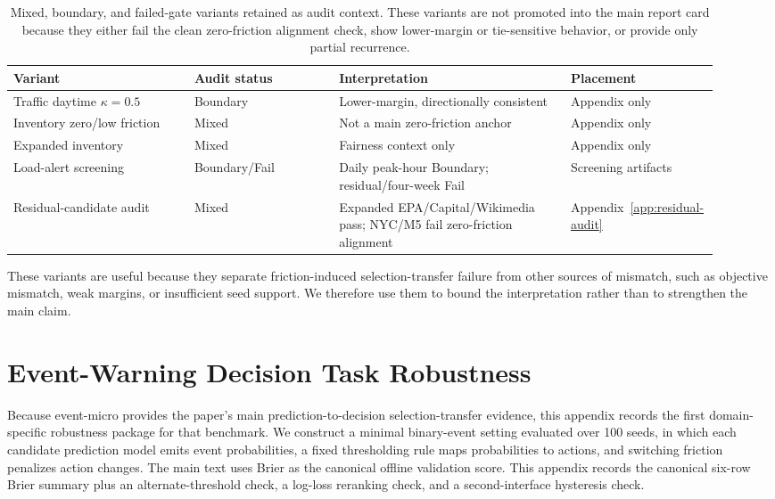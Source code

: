 \documentclass{article}
\begin{document}
\begin{table}[!htbp]
\centering
\begin{minipage}{\appnarrowtablewidth}
\centering
\scriptsize
\setlength{\tabcolsep}{3pt}
\renewcommand{\arraystretch}{0.98}
\begin{tabular}{p{0.25\linewidth}p{0.20\linewidth}p{0.32\linewidth}p{0.15\linewidth}}
\toprule
Variant & Audit status & Interpretation & Placement \\
\midrule
Traffic daytime $\kappa=0.5$ & Boundary & Lower-margin, directionally consistent & Appendix only \\
Inventory zero/low friction & Mixed & Not a main zero-friction anchor & Appendix only \\
Expanded inventory & Mixed & Fairness context only & Appendix only \\
Load-alert screening & Boundary/Fail & Daily peak-hour Boundary; residual/four-week Fail & Screening artifacts \\
Residual-candidate audit & Mixed & Expanded EPA/Capital/Wikimedia pass; NYC/M5 fail zero-friction alignment & Appendix~\ref{app:residual-audit} \\
\bottomrule
\end{tabular}
\caption{Mixed, boundary, and failed-gate variants retained as audit context. These variants are not promoted into the main report card because they either fail the clean zero-friction alignment check, show lower-margin or tie-sensitive behavior, or provide only partial recurrence.}
\label{tab:mixed_failed_gate_variants}
\end{minipage}
\end{table}

These variants are useful because they separate friction-induced selection-transfer failure from other sources of mismatch, such as objective mismatch, weak margins, or insufficient seed support. We therefore use them to bound the interpretation rather than to strengthen the main claim.

\section{Event-Warning Decision Task Robustness}
\label{app:event-micro}

Because event-micro provides the paper's main prediction-to-decision selection-transfer evidence, this appendix records the first domain-specific robustness package for that benchmark. We construct a minimal binary-event setting evaluated over 100 seeds, in which each candidate prediction model emits event probabilities, a fixed thresholding rule maps probabilities to actions, and switching friction penalizes action changes. The main text uses Brier as the canonical offline validation score. This appendix records the canonical six-row Brier summary plus an alternate-threshold check, a log-loss reranking check, and a second-interface hysteresis check.
\end{document}
